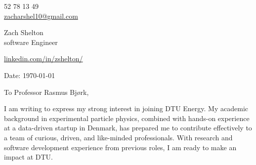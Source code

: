 \documentclass[11pt,a4]{article}
\begin{document}
\begin{center}
    \begin{minipage}[b]{0.24\textwidth}
            \large 52 78 13 49 \\
            \large \href{mailto:zacharshel10@gmail.com}{zacharshel10@gmail.com} 
    \end{minipage}%
    \begin{minipage}[b]{0.5\textwidth}
            \centering
            {\Huge Zach Shelton} \\ %
            \vspace{0.1cm}
            {\color{UI_blue} \Large{software Engineer}} \\
    \end{minipage}%
    \begin{minipage}[b]{0.24\textwidth}
            \flushright \large
            {\href{https://www.linkedin.com/in/zshelton/}{linkedin.com/in/zshelton/} } \\

    \end{minipage}   
    
\vspace{-0.15cm} 
{\color{UI_blue} \hrulefill}
\end{center}

\justify
\setlength{\parindent}{0pt}
\setlength{\parskip}{12pt}
\vspace{0.1cm}


Date: \today \par \vspace{-0.1cm}

To Professor Rasmus Bjørk,\

I am writing to express my strong interest in joining DTU Energy. My academic background in experimental particle physics, combined with hands-on experience at a data-driven startup in Denmark, has prepared me to contribute effectively to a team of curious, driven, and like-minded professionals. With research and software development experience from previous roles, I am ready to make an impact at DTU.
\end{document}
